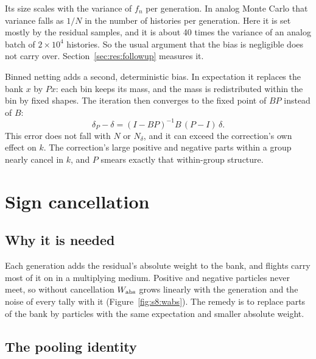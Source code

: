 Its size scales with the variance of $f_n$ per generation. In analog Monte Carlo that variance falls
as $1/N$ in the number of histories per generation. Here it is set mostly by the residual samples,
and it is about 40 times the variance of an analog batch of $2\times10^4$ histories. So the usual
argument that the bias is negligible does not carry over. Section~\ref{sec:res:followup} measures it.

Binned netting adds a second, deterministic bias. In expectation it replaces the bank $x$ by $Px$: each
bin keeps its mass, and the mass is redistributed within the bin by fixed shapes. The iteration then
converges to the fixed point of $BP$ instead of $B$:
\begin{equation}
\delta_P-\delta=(I-BP)^{-1}B\,(P-I)\,\delta .
\end{equation}
This error does not fall with $N$ or $N_\delta$, and it can exceed the correction's own effect on $k$.
The correction's large positive and negative parts within a group nearly cancel in $k$, and $P$ smears
exactly that within-group structure.

\section{Sign cancellation}\label{sec:cancellation}

\subsection{Why it is needed}

Each generation adds the residual's absolute weight to the bank, and flights carry most of it on in a
multiplying medium. Positive and negative particles never meet, so without cancellation $W_{\mathrm{abs}}$ grows
linearly with the generation and the noise of every tally with it (Figure~\ref{fig:s8:wabs}). The
remedy is to replace parts of the bank by particles with the same expectation and smaller absolute
weight.

\subsection{The pooling identity}

